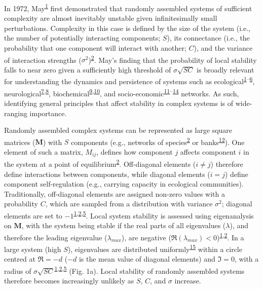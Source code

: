 \documentclass[]{article}
\begin{document}
In 1972, May\textsuperscript{\protect\hyperlink{ref-May1972}{1}} first
demonstrated that randomly assembled systems of sufficient complexity
are almost inevitably unstable given infinitesimally small
perturbations. Complexity in this case is defined by the size of the
system (i.e., the number of potentially interacting components; \(S\)),
its connectance (i.e., the probability that one component will interact
with another; \(C\)), and the variance of interaction strengths
(\(\sigma^{2}\))\textsuperscript{\protect\hyperlink{ref-Allesina2012}{2}}.
May's finding that the probability of local stability falls to near zero
given a sufficiently high threshold of \(\sigma\sqrt{SC}\) is broadly
relevant for understanding the dynamics and persistence of systems such
as
ecological\textsuperscript{\protect\hyperlink{ref-May1972}{1}--\protect\hyperlink{ref-Grilli2017}{6}},
neurological\textsuperscript{\protect\hyperlink{ref-Gray2008}{7},\protect\hyperlink{ref-Gray2009}{8}},
biochemical\textsuperscript{\protect\hyperlink{ref-Rosenfeld2009}{9},\protect\hyperlink{ref-MacArthur2010}{10}},
and
socio-economic\textsuperscript{\protect\hyperlink{ref-May2008}{11}--\protect\hyperlink{ref-Bardoscia2017}{14}}
networks. As such, identifying general principles that affect stability
in complex systems is of wide-ranging importance.

Randomly assembled complex systems can be represented as large square
matrices (\(\mathbf{M}\)) with \(S\) components (e.g., networks of
species\textsuperscript{\protect\hyperlink{ref-Allesina2012}{2}} or
banks\textsuperscript{\protect\hyperlink{ref-Haldane2011}{12}}). One
element of such a matrix, \(M_{ij}\), defines how component \(j\)
affects component \(i\) in the system at a point of
equilibrium\textsuperscript{\protect\hyperlink{ref-Allesina2012}{2}}.
Off-diagonal elements (\(i \neq j\)) therefore define interactions
between components, while diagonal elements (\(i = j\)) define component
self-regulation (e.g., carrying capacity in ecological communities).
Traditionally, off-diagonal elements are assigned non-zero values with a
probability \(C\), which are sampled from a distribution with variance
\(\sigma^{2}\); diagonal elements are set to
\(-1\)\textsuperscript{\protect\hyperlink{ref-May1972}{1},\protect\hyperlink{ref-Allesina2012}{2},\protect\hyperlink{ref-Allesina2015}{5}}.
Local system stability is assessed using eigenanalysis on
\(\mathbf{M}\), with the system being stable if the real parts of all
eigenvalues (\(\lambda\)), and therefore the leading eigenvalue
(\(\lambda_{max}\)), are negative
(\(\Re(\lambda_{max}) < 0\))\textsuperscript{\protect\hyperlink{ref-May1972}{1},\protect\hyperlink{ref-Allesina2012}{2}}.
In a large system (high \(S\)), eigenvalues are distributed
uniformly\textsuperscript{\protect\hyperlink{ref-Tao2010}{15}} within a
circle centred at \(\Re = -d\) (\(-d\) is the mean value of diagonal
elements) and \(\Im = 0\), with a radius of
\(\sigma\sqrt{SC}\)\textsuperscript{\protect\hyperlink{ref-May1972}{1},\protect\hyperlink{ref-Allesina2012}{2},\protect\hyperlink{ref-Allesina2015}{5}}
(Fig. 1a). Local stability of randomly assembled systems therefore
becomes increasingly unlikely as \(S\), \(C\), and \(\sigma\) increase.
\end{document}
